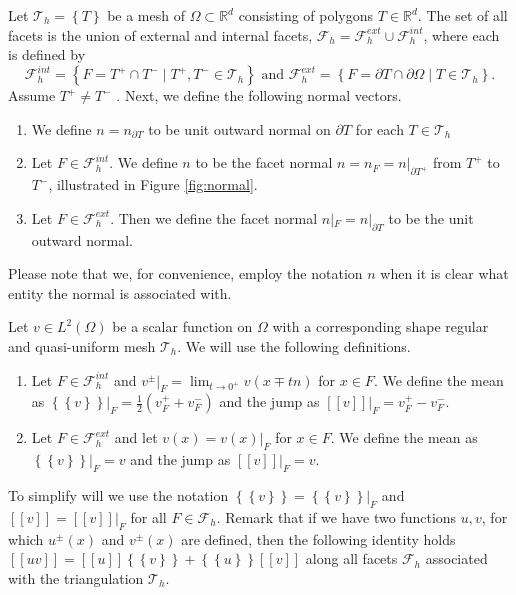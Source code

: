 \documentclass[11pt]{article}
\theoremstyle{remark}
\newcommand{\mean}[1]{\left\{\!\!\left\{#1\right\}\!\!\right\}}
\newcommand{\jump}[1]{\left[\!\left[ #1 \right]\!\right]}
\numberwithin{equation}{section}
\begin{document}
Let $\mathcal{T}_{h}  = \left\{ T \right\} $ be a mesh of $\Omega \subset  \mathbb{R} ^d $ consisting of polygons $T \in \mathbb{R} ^{d}$.
The set of all facets is the union of external and internal facets, $\mathcal{F} _{h} = \mathcal{F} ^{ext}_{h} \cup \mathcal{F} _{h}^{int} $, where each is defined by
\[
            \mathcal{F}^{int} _{h}  = \left\{ F=T^{+}\cap T^{-}  \mid  T^{+}, T^{-} \in \mathcal{T}_{h}  \right\} \text{ and }
            \mathcal{F}^{ext} _{h}  = \left\{ F= \partial T \cap \partial \Omega    \mid  T  \in \mathcal{T}_{h}  \right\}.
\]
Assume $T^{+} \neq T^{-}$ . Next, we define the following normal vectors.
\begin{enumerate}[label=\arabic*)]
    \item We define $ n= n  _{\partial T}$ to be unit outward normal on $\partial T$ for each $T \in \mathcal{T}_{h} $
\item Let $F \in \mathcal{F }^{int} _{h}$. We define $n$ to be the facet normal $ n =  n _F = n | _{\partial T^{+}} $  from $T^{+}$ to $T^{-}$, illustrated in Figure \ref{fig:normal}.
 \item Let $F \in \mathcal{F} ^{ext}_{h}$. Then we define the facet normal $n | _{F} = n | _{\partial T} $ to be the unit outward normal.
\end{enumerate}
Please note that we, for convenience, employ the notation $n$ when it is clear what entity the normal is associated with.

    Let $v\in L^2( \Omega ) $ be a scalar function on $\Omega$ with a corresponding shape regular and quasi-uniform mesh $\mathcal{T}_{h} $. We will use the following definitions.
    \begin{enumerate}[label=\arabic*)]
        \item Let $F \in \mathcal{F}^{int} _{h}$ and $v^{\pm}| _{F} = \lim_{t\to 0^{+}} v( x \mp tn)   $ for $x \in F$. We define the mean as $\mean{ v} |_{F} = \frac{1}{2} (v^{+}_{F} + v^{-}_{F})   $ and the jump as $\jump{v}|_{F} =  v^{+}_{F} - v^{-}_{F} $.
        \item Let $F \in \mathcal{F}^{ext} _{h}$ and let $ v( x) =  v(x)|_{F} $ for  $x \in F$.
We define the mean as $\mean{ v} |_{F} = v    $ and the jump as $\jump{v}|_{F} = v$.

    \end{enumerate}
    To simplify will we use the notation $\mean{ v } = \mean{ v }|_{F}    $ and $\jump{ v } = \jump{ v }| _{F}    $ for all $F \in \mathcal{F} _{h}$.
    Remark that if we have two functions $u,v$, for which $u^{\pm}( x) $ and $v^{\pm}( x) $ are defined, then the following identity holds $  \jump{ uv }    = \jump{ u }   \mean{ v }    + \mean{ u }  \jump{ v }$ along all facets $ \mathcal{F}_{h} $ associated with the
    triangulation $\mathcal{T} _{h}$.
\end{document}
